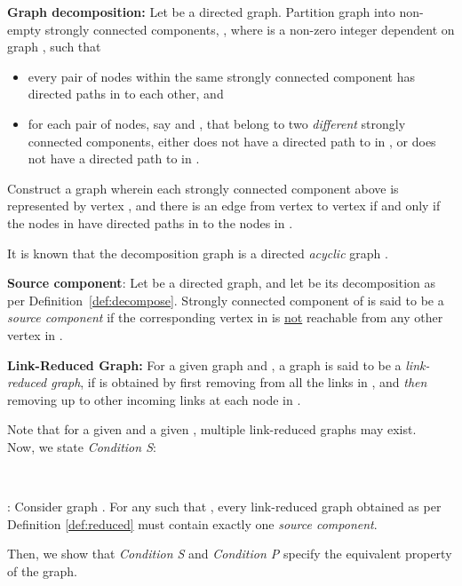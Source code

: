 \documentclass{llncs}
\begin{document}
\begin{definition}
\label{def:decompose}
{\bf Graph decomposition:}
Let  be a directed graph. Partition graph  into non-empty strongly connected components,
, where  is a non-zero integer dependent on graph ,
such that
\begin{itemize}
\item every pair of nodes {within} the same strongly connected component has directed
paths in  to each other, and
\item for each pair of nodes, say  and , that belong to
two {\em different} strongly connected components, either  does not have a
directed path to  in , or  does not have a directed path to  in .
\end{itemize}
Construct a graph  wherein each strongly connected component  above is represented
by vertex , and there is an edge from vertex  to vertex  if and only if
the nodes in  have directed paths in  to the nodes in .
\end{definition}
It is known that the decomposition
graph  is a directed {\em acyclic} graph \cite{dag_decomposition}.

\begin{definition}
{\bf Source component}:
Let  be a directed graph, and let  be its decomposition as per
Definition~\ref{def:decompose}. 
Strongly connected component  of  is said to be a {\em source component}
if the corresponding vertex  in  is \underline{not} reachable from any
other vertex in . 
\end{definition}

\begin{definition}
\label{def:reduced} {\bf Link-Reduced Graph:}
For a given graph  and ,
a graph 
is said to be a {\em link-reduced graph}, if
 is obtained by first removing from  all the links in , and {\em then} removing up to  other incoming
links at each node in .
\end{definition}
Note that for a given  and a given ,
multiple link-reduced graphs  may exist. \\

Now, we state {\em Condition S}:

~

: Consider graph . For any  such that , every
link-reduced graph  obtained as per Definition \ref{def:reduced} 
must contain exactly one {\em source component}.


Then, we show that {\em Condition S} and {\em Condition P} specify the equivalent property of the graph.
\end{document}
